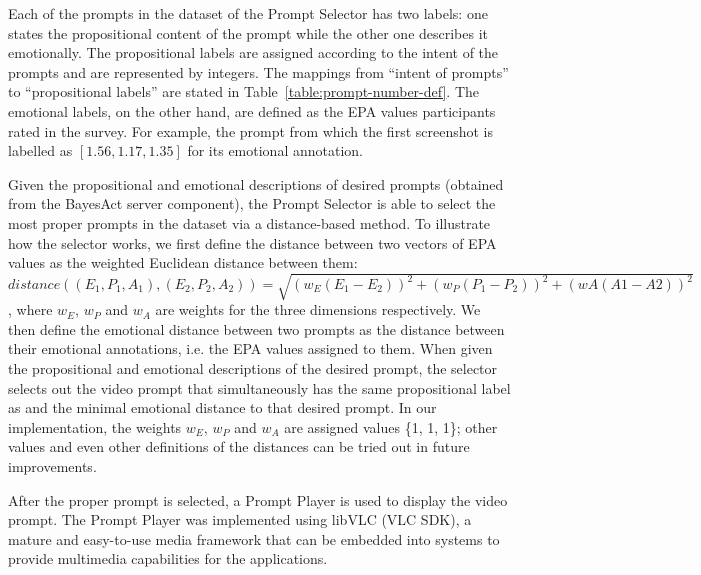 Each of the prompts in the dataset of the Prompt Selector has two labels: one states the propositional content of the prompt while the other one describes it emotionally. The propositional labels are assigned according to the intent of the prompts and are represented by integers. The mappings from ``intent of prompts'' to ``propositional labels'' are stated in Table~\ref{table:prompt-number-def}. The emotional labels, on the other hand, are defined as the EPA values participants rated in the survey. For example, the prompt from which the first screenshot is labelled as $[1.56, 1.17, 1.35]$ for its emotional annotation.

Given the propositional and emotional descriptions of desired prompts (obtained from the BayesAct server component), the Prompt Selector is able to select the most proper prompts in the dataset via a distance-based method. To illustrate how the selector works, we first define the distance between two vectors of EPA values as the weighted Euclidean distance between them:
$distance((E_1, P_1, A_1), (E_2, P_2, A_2))=\sqrt{(w_E(E_1-E_2))^2+(w_P(P_1-P_2))^2+(wA(A1-A2))^2}$,
where $w_E$, $w_P$ and $w_A$ are weights for the three dimensions respectively. We then define the emotional distance between two prompts as the distance between their emotional annotations, i.e. the EPA values assigned to them. When given the propositional and emotional descriptions of the desired prompt, the selector selects out the video prompt that simultaneously has the same propositional label as and the minimal emotional distance to that desired prompt. In our implementation, the weights $w_E$, $w_P$ and $w_A$ are assigned values \{1, 1, 1\}; other values and even other definitions of the distances can be tried out in future improvements.

After the proper prompt is selected, a Prompt Player is used to display the video prompt. The Prompt Player was implemented using libVLC (VLC SDK), a mature and easy-to-use media framework that can be embedded into systems to provide multimedia capabilities for the applications.



